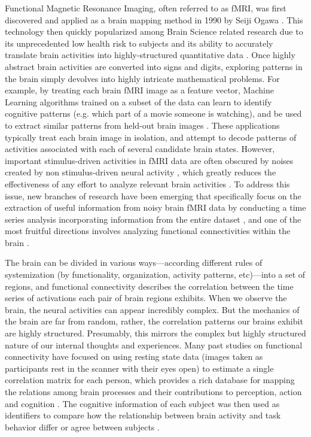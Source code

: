 \documentclass[11pt]{article}
\begin{document}
Functional Magnetic Resonance Imaging, often referred to as fMRI, was first discovered and applied as a brain mapping method in 1990 by Seiji Ogawa \citep{Ogawa90}. This technology then quickly popularized among Brain Science related research due to its unprecedented low health risk to subjects and its ability to accurately translate brain activities into highly-structured quantitative data \citep{Logothetis01}\citep{Friston99}\citep{Friston98}. Once highly abstract brain activities are converted into signs and digits, exploring patterns in the brain simply devolves into highly intricate mathematical problems. For example, by treating each brain fMRI image as a feature vector, Machine Learning algorithms trained on a subset of the data can learn to identify cognitive patterns (e.g. which part of a movie someone is watching), and be used to extract similar patterns from held-out brain images \citep{Norman06}\citep{peterson12}\citep{peterson17}. These applications typically treat each brain image in isolation, and attempt to decode patterns of activities associated with each of several candidate brain states. However, important stimulus-driven activities in fMRI data are often obscured by noises created by non stimulus-driven neural activity \citep{peterson11}, which greatly reduces the effectiveness of any effort to analyze relevant brain activities \citep{hasson2009}. To address this issue, new branches of research have been emerging that specifically focus on the extraction of useful information from noisy brain fMRI data by conducting a time series analysis incorporating information from the entire dataset \citep{tang2017}, and one of the most fruitful directions involves analyzing functional connectivities within the brain \citep{peterson19} \citep{peterson20}.

The brain can be divided in various ways---according different rules of systemization (by functionality, organization, activity patterns, etc)---into a set of regions, and functional connectivity describes the correlation between the time series of activations each pair of brain regions exhibits. When we observe the brain, the neural activities can appear incredibly complex. But the mechanics of the brain are far from random, rather, the correlation patterns our brains exhibit are highly structured. Presumably, this mirrors the complex but highly structured nature of our internal thoughts and experiences. Many past studies on functional connectivity have focused on using resting state data (images taken as participants rest in the scanner with their eyes open) to estimate a single correlation matrix for each person, which provides a rich database for mapping the relations among brain processes and their contributions to perception, action and cognition \citep{peterson9}\citep{Bassett2017}. The cognitive information of each subject was then used as identifiers to compare how the relationship between brain activity and task behavior differ or agree between subjects \citep{Turke13}\citep{Rubinov2010}\citep{peterson10}.
\end{document}
